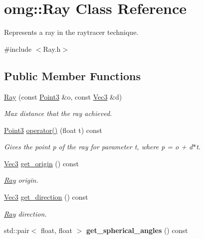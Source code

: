 \hypertarget{classomg_1_1_ray}{}\section{omg\+::Ray Class Reference}
\label{classomg_1_1_ray}


Represents a ray in the raytracer technique.  




{\ttfamily \#include $<$Ray.\+h$>$}

\subsection*{Public Member Functions}
\begin{DoxyCompactItemize}
\item 
\mbox{\hyperlink{classomg_1_1_ray_a7418b3be2225de5510c63781ee5ad3f1}{Ray}} (const \mbox{\hyperlink{namespaceomg_af85242d35fdacf829d32a6f9b95f3e35}{Point3}} \&o, const \mbox{\hyperlink{namespaceomg_a45a9482677fee9933ff369b49894e316}{Vec3}} \&d)
\begin{DoxyCompactList}\small\item\em Max distance that the ray achieved. \end{DoxyCompactList}\item 
\mbox{\hyperlink{namespaceomg_af85242d35fdacf829d32a6f9b95f3e35}{Point3}} \mbox{\hyperlink{classomg_1_1_ray_a841e085c48864a211faf98e3f529d567}{operator()}} (float t) const
\begin{DoxyCompactList}\small\item\em Gives the point p of the ray for parameter t, where p = o + d$\ast$t. \end{DoxyCompactList}\item 
\mbox{\hyperlink{namespaceomg_a45a9482677fee9933ff369b49894e316}{Vec3}} \mbox{\hyperlink{classomg_1_1_ray_a3b2c3ade0173b74f72e7bb4e72363cf3}{get\+\_\+origin}} () const
\begin{DoxyCompactList}\small\item\em \mbox{\hyperlink{classomg_1_1_ray}{Ray}} origin. \end{DoxyCompactList}\item 
\mbox{\hyperlink{namespaceomg_a45a9482677fee9933ff369b49894e316}{Vec3}} \mbox{\hyperlink{classomg_1_1_ray_aed10a92891a426b887927c75018f88b1}{get\+\_\+direction}} () const
\begin{DoxyCompactList}\small\item\em \mbox{\hyperlink{classomg_1_1_ray}{Ray}} direction. \end{DoxyCompactList}\item 
\mbox{\label{classomg_1_1_ray_a34ca629a70f809725e65158b3d841baa}} 
std\+::pair$<$ float, float $>$ {\bfseries get\+\_\+spherical\+\_\+angles} () const
\end{DoxyCompactItemize}
